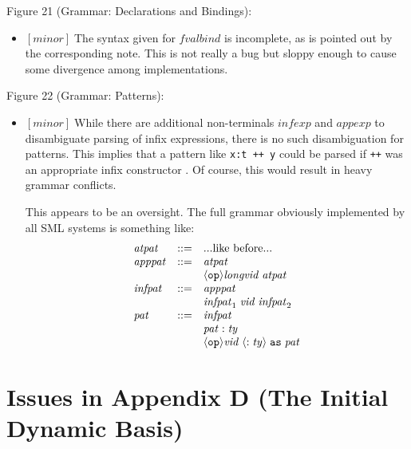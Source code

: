 \documentclass{article}
\newcommand{\m}[1]{$[\mathit{#1}]\;$}
\newcommand{\minor}{\m{minor}}
\begin{document}
Figure 21 (Grammar: Declarations and Bindings):
\nopagebreak

\begin{itemize}
\item \minor The syntax given for $\mathit{fvalbind}$ is incomplete, as is pointed out by the corresponding note. This is not really a bug but sloppy enough to cause some divergence among implementations.
\end{itemize}


Figure 22 (Grammar: Patterns):
\nopagebreak

\begin{itemize}
\item \minor While there are additional non-terminals $\mathit{infexp}$ and $\mathit{appexp}$ to disambiguate parsing of infix expressions, there is no such disambiguation for patterns. This implies that a pattern like {\tt x:t ++ y} could be parsed if {\tt ++} was an appropriate infix constructor \cite{addenda}. Of course, this would result in heavy grammar conflicts.

This appears to be an oversight. The full grammar obviously implemented by all SML systems is something like:
\begin{displaymath}
\begin{array}{lcll}
\mathit{atpat} &::=& \mbox{...like before...} \\
\mathit{apppat} &::=& \mathit{atpat} \\
&& \langle{\tt{op}}\rangle \mathit{longvid} \; \mathit{atpat} \\
\mathit{infpat} &::=& \mathit{apppat} \\
&& \mathit{infpat}_1 \; \mathit{vid} \; \mathit{infpat}_2 \\
\mathit{pat} &::=& \mathit{infpat} \\
&& \mathit{pat} \; {\tt:} \; \mathit{ty} \\
&& \langle{\tt{op}}\rangle \mathit{vid} \; \langle{\tt:} \; \mathit{ty}\rangle
	\; {\tt as} \; \mathit{pat}
\end{array}
\end{displaymath}
\end{itemize}


\section{Issues in Appendix D (The Initial Dynamic Basis)}
\label{bugsappendixd}
\end{document}
